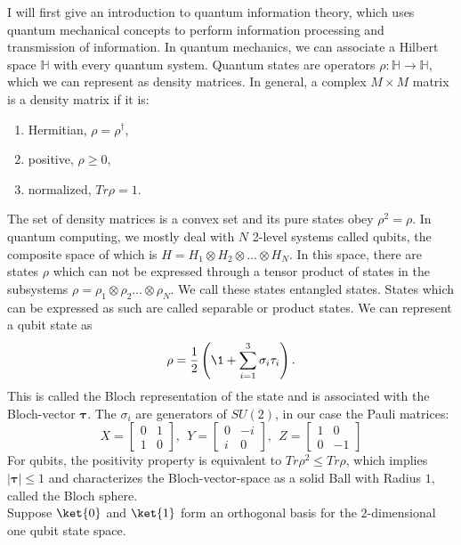 I will first give an introduction to quantum information theory, which uses quantum mechanical concepts to perform information processing and transmission of information.
In quantum mechanics, we can associate a Hilbert space $\mathbb{H}$ with every quantum system.
Quantum states are operators $\rho :\mathbb{H}\to\mathbb{H}$, which we can represent as density matrices.
In general, a complex $M \times M$ matrix is a density matrix if it is:
\begin{center}\begin{enumerate}
	\item Hermitian,	$\rho =\rho^{\dagger}$,
	\item positive,		$\rho \ge 0$,
	\item normalized, 	$Tr\rho = 1$.
\end{enumerate}\end{center}
The set of density matrices is a convex set and its pure states obey $\rho^2 = \rho$.
In quantum computing, we mostly deal with $N$ 2-level systems called qubits, the composite space of which is $H = H_1 \otimes H_2 \otimes \ldots \otimes H_N$.
In this space, there are states $\rho$ which can not be expressed through a tensor product of states in the subsystems $\rho = \rho_1\otimes\rho_2\ldots\otimes\rho_N$.
We call these states entangled states.
States which can be expressed as such are called separable or product states.
We can represent a qubit state as \[
	\rho= \frac{1}{2}\left( \1 + \sum_{i=1}^{3} \sigma_i\tau_i \right)
.\]
This is called the Bloch representation of the state and is associated with the Bloch-vector $\bm{\tau}$.
The $\sigma_i$ are generators of $SU\left( 2 \right) $, in our case the Pauli matrices:
$$
 X = \begin{bmatrix} 0 & 1 \\
                    1 & 0
        \end{bmatrix},~
	~Y = \begin{bmatrix} 0 & -i \\
                    i & 0
         \end{bmatrix},~
    ~Z = \begin{bmatrix} 1 & 0 \\
                    0 & -1
        \end{bmatrix}
$$
For qubits, the positivity property is equivalent to $Tr\rho^2\le Tr\rho$, which implies $|\bm{\tau}|\le 1$ and characterizes the Bloch-vector-space as a solid Ball with Radius $1$, called the Bloch sphere.\\
Suppose $\ket{0}$ and $\ket{1}$ form an orthogonal basis for the $2$-dimensional one qubit state space.

